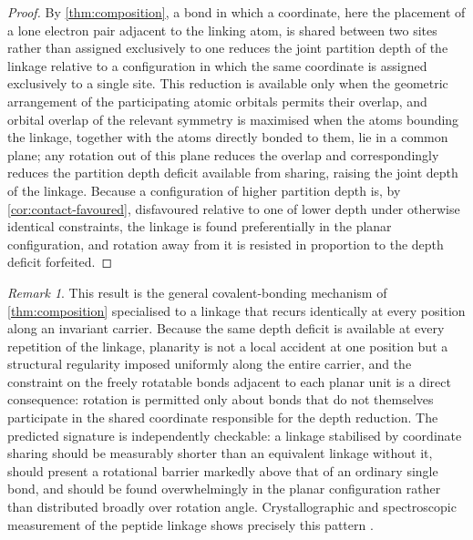 \documentclass[11pt,twocolumn,a4paper]{article}
\theoremstyle{plain}
\theoremstyle{definition}
\theoremstyle{remark}
\newtheorem{remark}[theorem]{Remark}
\begin{document}
\begin{proof}
By \cref{thm:composition}, a bond in which a coordinate, here the placement
of a lone electron pair adjacent to the linking atom, is shared between two
sites rather than assigned exclusively to one reduces the joint partition
depth of the linkage relative to a configuration in which the same
coordinate is assigned exclusively to a single site. This reduction is
available only when the geometric arrangement of the participating atomic
orbitals permits their overlap, and orbital overlap of the relevant
symmetry is maximised when the atoms bounding the linkage, together with the
atoms directly bonded to them, lie in a common plane; any rotation out of
this plane reduces the overlap and correspondingly reduces the partition
depth deficit available from sharing, raising the joint depth of the
linkage. Because a configuration of higher partition depth is, by
\cref{cor:contact-favoured}, disfavoured relative to one of lower depth
under otherwise identical constraints, the linkage is found preferentially
in the planar configuration, and rotation away from it is resisted in
proportion to the depth deficit forfeited.
\end{proof}

\begin{remark}
This result is the general covalent-bonding mechanism of
\cref{thm:composition} specialised to a linkage that recurs identically at
every position along an invariant carrier. Because the same depth deficit
is available at every repetition of the linkage, planarity is not a local
accident at one position but a structural regularity imposed uniformly
along the entire carrier, and the constraint on the freely rotatable bonds
adjacent to each planar unit is a direct consequence: rotation is permitted
only about bonds that do not themselves participate in the shared
coordinate responsible for the depth reduction. The predicted signature is
independently checkable: a linkage stabilised by coordinate sharing should
be measurably shorter than an equivalent linkage without it, should present
a rotational barrier markedly above that of an ordinary single bond, and
should be found overwhelmingly in the planar configuration rather than
distributed broadly over rotation angle. Crystallographic and
spectroscopic measurement of the peptide linkage shows precisely this
pattern \citep{pauling1951,ramachandran1968,macarthur1996}.
\end{remark}
\end{document}
